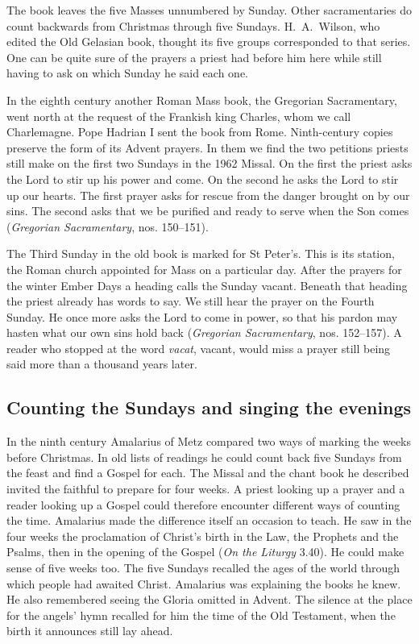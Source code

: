 The book leaves the five Masses unnumbered by Sunday. Other
sacramentaries do count backwards from Christmas through five Sundays.
H.~A.~Wilson, who edited the Old Gelasian book, thought its five groups
corresponded to that series. One can be quite sure of the prayers a
priest had before him here while still having to ask on which Sunday
he said each one.

In the eighth century another Roman Mass book, the Gregorian Sacramentary,
went north at the request of the Frankish king Charles, whom we call
Charlemagne. Pope Hadrian I sent the book from Rome. Ninth-century copies
preserve the form of its Advent prayers. In them we find the two petitions priests still make
on the first two Sundays in the 1962 Missal. On the first the priest asks the Lord
to stir up his power and come. On the second he asks the Lord to stir up our
hearts. The first prayer asks for rescue from the danger brought on by our
sins. The second asks that we be purified and ready to serve when the Son
comes (\emph{Gregorian Sacramentary}, nos. 150--151).

The Third Sunday in the old book is marked for St Peter's. This is its
station, the Roman church appointed for Mass on a particular day. After the
prayers for the winter Ember Days a heading calls the Sunday vacant.
Beneath that heading the priest already has words to say. We still hear
the prayer on the Fourth Sunday. He once more
asks the Lord to come in power, so that his pardon may hasten what our own
sins hold back (\emph{Gregorian Sacramentary}, nos. 152--157). A
reader who stopped at the word \emph{vacat}, vacant, would miss a
prayer still being said more than a thousand years later.

\subsection{Counting the Sundays and singing the evenings}

In the ninth century Amalarius of Metz compared two ways of marking the
weeks before Christmas. In old lists of readings he could count back five
Sundays from the feast and find a Gospel for each. The Missal and the chant book he
described invited the faithful to prepare for four weeks. A priest
looking up a prayer and a reader looking up a Gospel could therefore
encounter different ways of counting the time. Amalarius made the
difference itself an occasion to teach. He saw in the
four weeks the proclamation of Christ's birth in the Law, the Prophets and
the Psalms, then in the opening of the Gospel (\emph{On the Liturgy} 3.40).
He could make sense of five weeks too. The five Sundays recalled the
ages of the world through which people had awaited Christ. Amalarius was
explaining the books he knew. He also remembered seeing the Gloria
omitted in Advent. The silence at the place for the angels' hymn
recalled for him the time of the Old Testament, when the birth it
announces still lay ahead.

